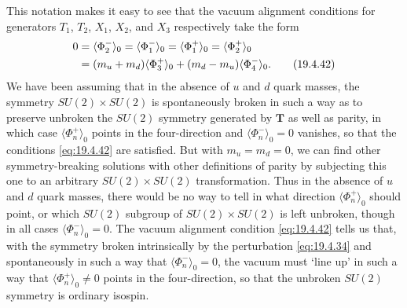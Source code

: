 This notation makes it easy to see that the vacuum alignment conditions for generators $T_1$, $T_2$, $X_1$, $X_2$, and $X_3$ respectively take the form
\begin{align}
0
&=\langle\Phi_2^-\rangle_0
=\langle\Phi_1^-\rangle_0
=\langle\Phi_1^+\rangle_0
=\langle\Phi_2^+\rangle_0
\notag\\
&=(m_u+m_d)\langle\Phi_3^+\rangle_0
+(m_d-m_u)\langle\Phi_4^-\rangle_0.
\tag{19.4.42}\label{eq:19.4.42}
\end{align}
We have been assuming that in the absence of $u$ and $d$ quark masses, the symmetry $SU(2)\times SU(2)$ is spontaneously broken in such a way as to preserve unbroken the $SU(2)$ symmetry generated by $\mathbf{T}$ as well as parity, in which case $\langle\Phi_n^+\rangle_0$ points in the four-direction and $\langle\Phi_n^-\rangle_0=0$ vanishes, so that the conditions \eqref{eq:19.4.42} are satisfied. But with $m_u=m_d=0$, we can find other symmetry-breaking solutions with other definitions of parity by subjecting this one to an arbitrary $SU(2)\times SU(2)$ transformation. Thus in the absence of $u$ and $d$ quark masses, there would be no way to tell in what direction $\langle\Phi_n^+\rangle_0$ should point, or which $SU(2)$ subgroup of $SU(2)\times SU(2)$ is left unbroken, though in all cases $\langle\Phi_n^-\rangle_0=0$. The vacuum alignment condition \eqref{eq:19.4.42} tells us that, with the symmetry broken intrinsically by the perturbation \eqref{eq:19.4.34} and spontaneously in such a way that $\langle\Phi_n^-\rangle_0=0$, the vacuum must `line up' in such a way that $\langle\Phi_n^+\rangle_0\ne0$ points in the four-direction, so that the unbroken $SU(2)$ symmetry is ordinary isospin.

